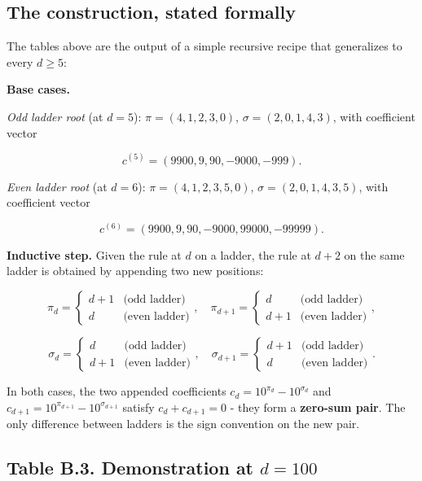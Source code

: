 \documentclass[11pt,letterpaper]{article}
\theoremstyle{paperstyle}
\theoremstyle{paperstyledef}
\theoremstyle{paperstylerem}
\begin{document}
\hypertarget{b.3.-the-construction-stated-formally}{%
\subsection{The construction, stated formally}\label{b.3.-the-construction-stated-formally}}

The tables above are the output of a simple recursive recipe that
generalizes to every \(d \geq 5\):

\textbf{Base cases.}

\emph{Odd ladder root} (at \(d = 5\)): \(\pi = (4, 1, 2, 3, 0)\),
\(\sigma = (2, 0, 1, 4, 3)\), with coefficient vector

\[c^{(5)} = (9900, 9, 90, -9000, -999).\]

\emph{Even ladder root} (at \(d = 6\)): \(\pi = (4, 1, 2, 3, 5, 0)\),
\(\sigma = (2, 0, 1, 4, 3, 5)\), with coefficient vector

\[c^{(6)} = (9900, 9, 90, -9000, 99000, -99999).\]

\textbf{Inductive step.} Given the rule at \(d\) on a ladder, the rule
at \(d + 2\) on the same ladder is obtained by appending two new
positions:

\[\pi_{d} = \begin{cases} d + 1 & \text{(odd ladder)} \\ d & \text{(even ladder)} \end{cases}, \quad \pi_{d+1} = \begin{cases} d & \text{(odd ladder)} \\ d + 1 & \text{(even ladder)} \end{cases},\]

\[\sigma_{d} = \begin{cases} d & \text{(odd ladder)} \\ d + 1 & \text{(even ladder)} \end{cases}, \quad \sigma_{d+1} = \begin{cases} d + 1 & \text{(odd ladder)} \\ d & \text{(even ladder)} \end{cases}.\]

In both cases, the two appended coefficients
\(c_d = 10^{\pi_d} - 10^{\sigma_d}\) and
\(c_{d+1} = 10^{\pi_{d+1}} - 10^{\sigma_{d+1}}\) satisfy
\(c_d + c_{d+1} = 0\) - they form a \textbf{zero-sum pair}. The only
difference between ladders is the sign convention on the new pair.

\hypertarget{table-b.3.-demonstration-at-d-100}{%
\subsection{\texorpdfstring{Table B.3. Demonstration at \(d = 100\)}{Table B.3. Demonstration at d = 100}}\label{table-b.3.-demonstration-at-d-100}}
\end{document}
